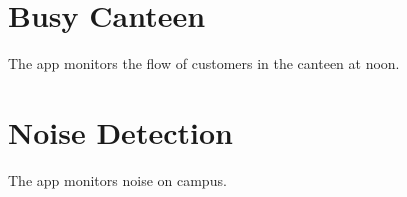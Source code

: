 \section{Busy Canteen}
The app monitors the flow of customers in the canteen at noon.


\section{Noise Detection}
The app monitors noise on campus.

